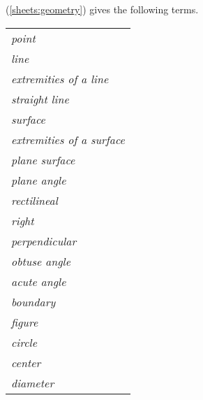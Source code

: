 \vspace{0.5cm}


(\ref{sheets:geometry})
gives the following terms.

{ \tiny
\begin{tabular}{l}

\textit{point}
\\

\textit{line}
\\

\textit{extremities of a line}
\\

\textit{straight line}
\\

\textit{surface}
\\

\textit{extremities of a surface}
\\

\textit{plane surface}
\\

\textit{plane angle}
\\

\textit{rectilineal}
\\

\textit{right}
\\

\textit{perpendicular}
\\

\textit{obtuse angle}
\\

\textit{acute angle}
\\

\textit{boundary}
\\

\textit{figure}
\\

\textit{circle}
\\

\textit{center}
\\

\textit{diameter}
\\

\end{tabular}
}


\clearpage{}

\newpage
\label{venn_diagrams}
\label{sheets:venn_diagrams}
\hypertarget{venn_diagrams}{}


\clearpage



